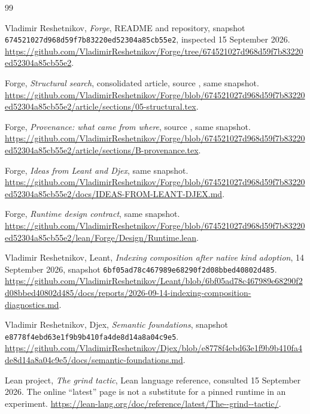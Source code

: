 \clearpage
\begin{thebibliography}{99}
\setlength{\itemsep}{6pt}\setlength{\parskip}{0pt}
\normalsize
{}
Vladimir Reshetnikov, \emph{Forge}, README and repository, snapshot
\texttt{674521027d968d59f7b83220ed52304a85cb55e2}, inspected 15 September 2026.
\url{https://github.com/VladimirReshetnikov/Forge/tree/674521027d968d59f7b83220ed52304a85cb55e2}.

Forge, \emph{Structural search}, consolidated article, source
, same snapshot.
\url{https://github.com/VladimirReshetnikov/Forge/blob/674521027d968d59f7b83220ed52304a85cb55e2/article/sections/05-structural.tex}.

Forge, \emph{Provenance: what came from where}, source
, same snapshot.
\url{https://github.com/VladimirReshetnikov/Forge/blob/674521027d968d59f7b83220ed52304a85cb55e2/article/sections/B-provenance.tex}.

Forge, \emph{Ideas from Leant and Djex}, same snapshot.
\url{https://github.com/VladimirReshetnikov/Forge/blob/674521027d968d59f7b83220ed52304a85cb55e2/docs/IDEAS-FROM-LEANT-DJEX.md}.

Forge, \emph{Runtime design contract}, same snapshot.
\url{https://github.com/VladimirReshetnikov/Forge/blob/674521027d968d59f7b83220ed52304a85cb55e2/lean/Forge/Design/Runtime.lean}.

Vladimir Reshetnikov, Leant, \emph{Indexing composition after native kind
adoption}, 14 September 2026, snapshot
\texttt{6bf05ad78c467989e68290f2d08bbed40802d485}.
\url{https://github.com/VladimirReshetnikov/Leant/blob/6bf05ad78c467989e68290f2d08bbed40802d485/docs/reports/2026-09-14-indexing-composition-diagnostics.md}.

Vladimir Reshetnikov, Djex, \emph{Semantic foundations}, snapshot
\texttt{e8778f4ebd63e1f9b9b410fa4de8d14a8a04c9e5}.
\url{https://github.com/VladimirReshetnikov/Djex/blob/e8778f4ebd63e1f9b9b410fa4de8d14a8a04c9e5/docs/semantic-foundations.md}.

Lean project, \emph{The grind tactic}, Lean language reference, consulted
15 September 2026. The online ``latest'' page is not a substitute for a pinned
runtime in an experiment.
\url{https://lean-lang.org/doc/reference/latest/The--grind--tactic/}.


\end{thebibliography}

